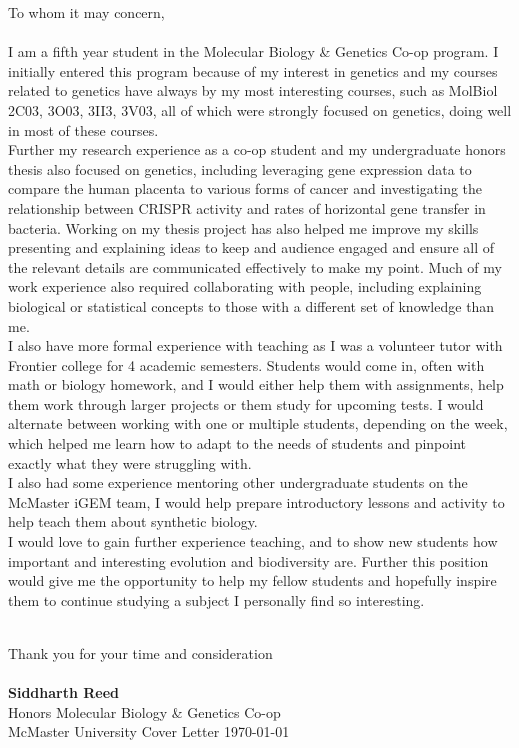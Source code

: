 \documentclass[11pt, a4paper]{./Awesome-CV/awesome-cv}
\begin{document}
\makecvheader[C] %
\vspace{1.2in}
\makelettertitle %

\begin{cvletter}
To whom it may concern, \\\\
I am a fifth year student in the Molecular Biology \& Genetics Co-op program.
I initially entered this program because of my interest in genetics and my courses related to genetics have always by my most interesting courses, such as MolBiol 2C03, 3O03, 3II3, 3V03, all of which were strongly focused on genetics, doing well in most of these courses.\\
Further my research experience as a co-op student and my undergraduate honors thesis also focused on genetics, including leveraging gene expression data to compare the human placenta to various forms of cancer and investigating the relationship between CRISPR activity and rates of horizontal gene transfer in bacteria.
Working on my thesis project has also helped me improve my skills presenting and explaining ideas to keep and audience engaged and ensure all of the relevant details are communicated effectively to make my point.
Much of my work experience also required collaborating with people, including explaining biological or statistical concepts to those with a different set of knowledge than me.\\
I also have more formal experience with teaching as I was a volunteer tutor with Frontier college for 4 academic semesters.
Students would come in, often with math or biology homework, and I would either help them with assignments, help them work through larger projects or them study for upcoming tests.
I would alternate between working with one or multiple students, depending on the week, which helped me learn how to adapt to the needs of students and pinpoint exactly what they were struggling with.\\
I also had some experience mentoring other undergraduate students on the McMaster iGEM team, I would help prepare introductory lessons and activity to help teach them about synthetic biology.\\
I would love to gain further experience teaching, and to show new students how important and interesting evolution and biodiversity are. Further this position would give me the opportunity to help my fellow students and hopefully inspire them to continue studying a subject I personally find so interesting.
\vspace{1.3in}
\end{cvletter}
\\ Thank you for your time and consideration\\\\
\textbf{Siddharth Reed}\\
Honors Molecular Biology \& Genetics Co-op\\
McMaster University
 {Cover Letter} {\today}%
\end{document}
